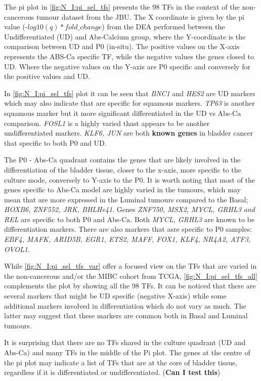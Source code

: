 The pi plot in \cref{fig:N_I:pi_sel_tfs} presents the 98 TFs in the context of the non-cancerous tumour dataset from the JBU. The X coordinate is given by the pi value (-$log10(q)*fold\_change$) from the DEA performed between the Undifferentiated (UD) and Abs-Calcium group, where the Y-coordinate is the comparison between UD and P0 (in-situ). The positive values on the X-axis represents the ABS-Ca specific TF, while the negative values the genes closed to UD. Where the negative values on the Y-axis are P0 specific and conversely for the positive values and UD.

In \cref{fig:N_I:pi_sel_tfs} plot it can be seen that \textit{BNC1} and \textit{HES2} are UD markers which may also indicate that are specific for squamous markers. \textit{TP63} is another squamous marker\citet{Robertson2017-mg} but it more significant differentiated in the UD vs Abs-Ca comparison. \textit{FOSL1} is a highly varied thast appears to be another undifferentiated markers. \textit{KLF6, JUN} are both \textbf{known genes} in bladder cancer that specific to both P0 and UD.

The P0 - Abs-Ca quadrant contains the genes that are likely involved in the differentiation of the bladder tissue, closer to the x-axis, more specific to the culture mode, conversely to Y-axis to the P0. It is worth noting that most of the genes specific to Abs-Ca model are highly varied in the tumours, which may mean that are more expressed in the Luminal tumours compared to the Basal; \textit{HOXB6, ZNF552, JRK, BHLHe41}. Genes \textit{ZNF750, MSX2, MYCL, GRHL3 and REL} are specific to both P0 and Abs-Ca. Both \textit{MYCL, GRHL3} are known to be differentiation markers. There are also markers that asre specific to P0 samples: \textit{EBF4, MAFK, ARID5B, EGR1, ETS2, MAFF, FOX1, KLF4, NR4A2, ATF3, OVOL1}. 

While \cref{fig:N_I:pi_sel_tfs_var} offer a focused view on the TFs that are varied in the non-cancerous and/or the MIBC cohort from TCGA, \cref{fig:N_I:pi_sel_tfs_all} complements the plot by showing all the 98 TFs. It can be noticed that there are several markers that might be UD specific (negative X-axis) while some additional markers involved in differentiation which do not vary as much. The latter may suggest that these markers are common both in Basal and Luminal tumours. 

It is surprising that there are no TFs shared in the culture quadrant (UD and Abs-Ca) and many TFs in the middle of the Pi plot. The genes at the centre of the pi plot may indicate a list of TFs that are at the core of bladder tissue, regardless if it is differentiated or undifferentiated. (\textbf{Can I test this})


